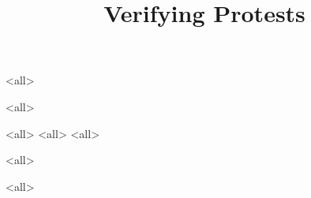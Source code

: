 \title{%
  Verifying Protests
}

\maketitle

\mode*

\begin{abstract}
  
\end{abstract}

\clearpage
\tableofcontents
\clearpage

\mode<all>


\mode<all>


\mode<all>
%
\mode<all>
%
\mode<all>
%

\mode<all>

\mode<all>




\begin{frame}
  \printbibliography{}
\end{frame}
